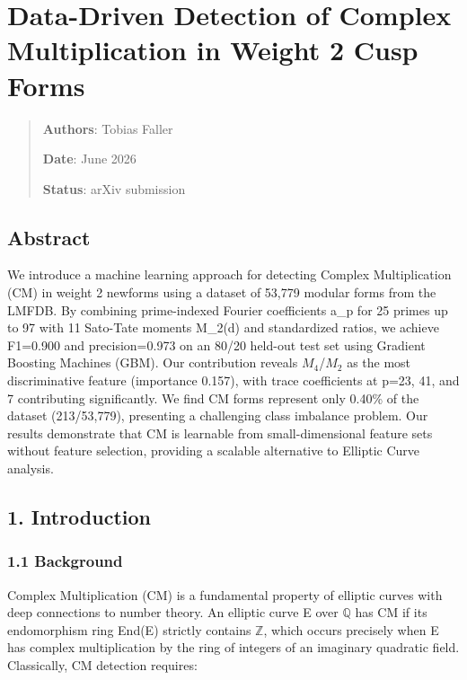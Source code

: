 \documentclass[
]{article}
\author{}
\date{}
\begin{document}
\hypertarget{data-driven-detection-of-complex-multiplication-in-weight-2-cusp-forms}{%
\section{Data-Driven Detection of Complex Multiplication in Weight 2
Cusp
Forms}\label{data-driven-detection-of-complex-multiplication-in-weight-2-cusp-forms}}

\begin{quote}
\textbf{Authors}: Tobias Faller

\textbf{Date}: June 2026

\textbf{Status}: arXiv submission
\end{quote}

\hypertarget{abstract}{%
\subsection{Abstract}\label{abstract}}

We introduce a machine learning approach for detecting Complex
Multiplication (CM) in weight 2 newforms using a dataset of 53,779
modular forms from the LMFDB. By combining prime-indexed Fourier
coefficients a\_p for 25 primes up to 97 with 11 Sato-Tate moments
M\_2(d) and standardized ratios, we achieve F1=0.900 and precision=0.973
on an 80/20 held-out test set using Gradient Boosting Machines (GBM).
Our contribution reveals $M_4$/$M_2$ as the most discriminative feature
(importance 0.157), with trace coefficients at p=23, 41, and 7
contributing significantly. We find CM forms represent only 0.40\% of
the dataset (213/53,779), presenting a challenging class imbalance
problem. Our results demonstrate that CM is learnable from
small-dimensional feature sets without feature selection, providing a
scalable alternative to Elliptic Curve analysis.

\hypertarget{introduction}{%
\subsection{1. Introduction}\label{introduction}}

\hypertarget{background}{%
\subsubsection{1.1 Background}\label{background}}

Complex Multiplication (CM) is a fundamental property of elliptic curves
with deep connections to number theory. An elliptic curve E over $\mathbb{Q}$ has
CM if its endomorphism ring End(E) strictly contains $\mathbb{Z}$, which occurs
precisely when E has complex multiplication by the ring of integers of
an imaginary quadratic field. Classically, CM detection requires:
\end{document}
